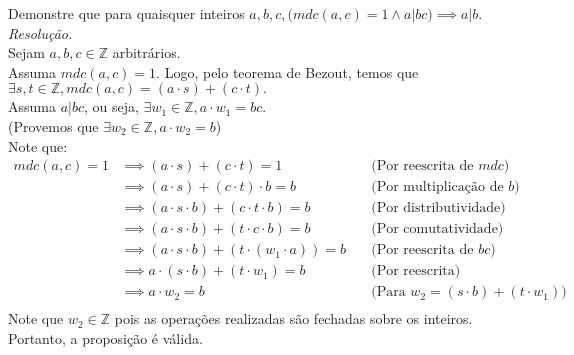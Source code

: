 Demonstre que para quaisquer inteiros $a, b, c, (mdc(a, c) = 1 \land a | bc) \implies a | b$. \\
\emph{Resolução.} \\
Sejam $a, b, c \in \mathbb{Z}$ arbitrários. \\
Assuma $mdc(a, c) = 1$. Logo, pelo teorema de Bezout, temos que $\exists s, t \in \mathbb{Z}, mdc(a, c) = (a \cdot s) + (c \cdot t).$ \\
Assuma $a | bc$, ou seja, $\exists w_1 \in \mathbb{Z}, a \cdot w_1 = bc$. \\
(Provemos que $\exists w_2 \in \mathbb{Z}, a \cdot w_2 = b$) \\
Note que:
\begin{align*}
	mdc(a, c) = 1 & \implies (a \cdot s) + (c \cdot t) = 1 &\quad \text{(Por reescrita de $mdc$)} \\
	&\implies (a \cdot s) + (c \cdot t) \cdot b = b &\quad \text{(Por multiplicação de $b$)} \\
	&\implies (a \cdot s \cdot b) + (c \cdot t \cdot b) = b &\quad \text{(Por distributividade)} \\
	&\implies (a \cdot s \cdot b) + (t \cdot c \cdot b) = b &\quad \text{(Por comutatividade)} \\
	&\implies (a \cdot s \cdot b) + (t \cdot (w_1 \cdot a)) = b &\quad \text{(Por reescrita de $bc$)} \\
	&\implies a \cdot (s \cdot b) + (t \cdot w_1) = b &\quad \text{(Por reescrita)} \\
	&\implies a \cdot w_2 = b &\quad \text{(Para $w_2 = (s \cdot b) + (t \cdot w_1)$)} \\
\end{align*}
Note que $w_2 \in \mathbb{Z}$ pois as operações realizadas são fechadas sobre os inteiros. \\
Portanto, a proposição é válida.
